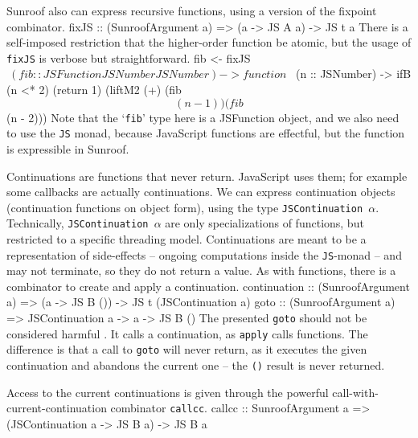 \documentclass{llncs}
\newcommand{\Src}[1]{{\tt{#1}}}
\newcommand{\JS}{\Src{JS}}
\newenvironment{Code}{\verbatim}{\endverbatim}
\begin{document}
Sunroof also can express recursive functions, using a version
of the fixpoint combinator.
\begin{Code}
fixJS :: (SunroofArgument a) => (a -> JS A a) -> JS t a
\end{Code}
There is a self-imposed restriction that the higher-order function be
atomic, but the usage of \Src{fixJS} is verbose but straightforward.
\begin{Code}
  fib <- fixJS $ \ (fib :: JSFunction JSNumber JSNumber) -> 
         function $ \ (n :: JSNumber) -> 
           ifB (n <* 2)
               (return 1)
               (liftM2 (+) (fib $$ (n - 1)) (fib $$ (n - 2)))
\end{Code}
Note that the `\Src{fib}' type here is a JSFunction object,
and we also need to use the \Src{JS} monad, because JavaScript
functions are effectful, but the function is expressible in Sunroof.

Continuations are functions that never return. JavaScript uses them; 
for example some callbacks are actually continuations. We can express
continuation objects (continuation functions on object form),
using the type \Src{JSContinuation $\alpha$}.
Technically, \Src{JSContinuation $\alpha$} are only
specializations of functions, but
restricted to a specific threading model. Continuations
are meant to be a representation of side-effects -- 
ongoing computations inside the \JS-monad -- and may  
not terminate, so they do not return a value. As with functions, 
there is a combinator to create and apply a continuation.
\begin{Code}
continuation :: (SunroofArgument a) 
             => (a -> JS B ()) -> JS t (JSContinuation a)
goto         :: (SunroofArgument a) 
             => JSContinuation a -> a -> JS B ()
\end{Code}
The presented \Src{goto} should not be considered 
harmful \cite{Dijkstra:68:GotoConsideredHarmful}.
It calls a continuation,
as \Src{apply} calls functions.
The difference is that a call to \Src{goto} will never
return, as it executes the given continuation and abandons the 
current one -- the \Src{()} result is never returned.

Access to the current continuations is given through
the powerful call-with-current-continuation 
combinator \Src{callcc}.
\begin{Code}
callcc :: SunroofArgument a 
       => (JSContinuation a -> JS B a) -> JS B a
\end{Code}
\end{document}
